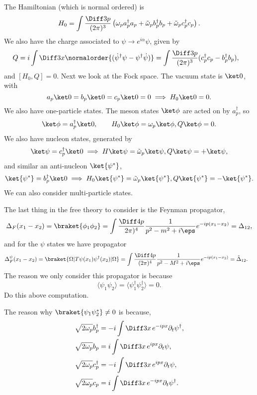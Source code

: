 \documentclass[12pt]{article}
\begin{document}
The Hamiltonian (which is normal ordered) is
\[
H_0 = \int \frac{\Diff3p}{(2\pi)^3} \left( \omega_p a_p^{\dagger} a_p + \tilde \omega_p b_p^{\dagger} b_p + \tilde \omega_p c_p^{\dagger} c_p \right).
\]
We also have the charge associated to $\psi \to e^{i\alpha} \psi$, given by
\begin{align*}
	Q &= i \int \Diff 3x \normalorder{( \dot \psi^{\dagger} \psi - \psi^{\dagger} \dot \psi)} = \int \frac{\Diff 3p}{(2 \pi)^3} (c_p^{\dagger} c_p - b_p^{\dagger} b_p),
\end{align*}
and $[H_0, Q] = 0$. Next we look at the Fock space. The vacuum state is $\ket 0$, with
\[
a_p \ket 0 = b_p \ket 0 = c_p \ket 0 = 0 \implies H_0 \ket 0 = 0.
\]
We also have one-particle states. The meson states $\ket \phi$ are acted on by $a_p^{\dagger}$, so
\[
\ket \phi = a_p^{\dagger} \ket 0, \qquad H_0 \ket \phi = \omega_p \ket \phi, Q \ket \phi = 0.
\]
We also have nucleon states, generated by
\[
\ket \psi = c_p^{\dagger} \ket 0 \implies H \ket \psi = \tilde \omega_p \ket \psi, Q \ket \psi = + \ket \psi,
\]
and similar an anti-nucleon $\ket{\psi^{\ast}}$,
\[
	\ket{\psi^{\ast}} = b_p^{\dagger} \ket 0 \implies H_0 \ket{\psi^{\ast}} = \tilde \omega_p \ket{\psi^{\ast}}, Q \ket{\psi^{\ast}} = - \ket{\psi^{\ast}}.
\]
We can also consider multi-particle states.

The last thing in the free theory to consider is the Feynman propagator,
\[
	\Delta_F(x_1 - x_2) = \braket{\phi_1 \phi_2} = \int \frac{\Diff 4 p}{2 \pi)^4} \frac{1}{p^2 - m^2 + i \eps} e^{-ip(x_1 - x_2)} = \Delta_{12},
\]
and for the $\psi$ states we have propagator
\begin{align*}
	\Delta^{\psi}_F(x_1 - x_2) &= \braket{\Omega | T \psi(x_1) \psi^{\dagger}(x_2) | \Omega} = \int \frac{\Diff 4 p}{(2 \pi)^{4}} \frac{1}{p^2 - M^2 + i \eps} e^{-ip(x_1 - x_2)} = \hat \Delta_{12}.
\end{align*}
The reason we only consider this propagator is because
\[
\langle \psi_1 \psi_2 \rangle = \langle \psi_1^{\dagger} \psi_2^{\dagger} \rangle = 0.
\]
Do this above computation.

The reason why $\braket{\psi_1 \psi_2^{\ast}} \neq 0$ is because,
\begin{align*}
	\sqrt{2 \omega_p} b_p^{\dagger} &= - i \int \Diff 3 x \, e^{-ipx} \partial_t \psi^{\dagger}, \\
	\sqrt{2 \omega_p} b_p &= i \int \Diff 3 x \, e^{ipx} \partial_t \psi, \\
	\sqrt{2 \omega_p} c_p^{\dagger} &= -i \int \Diff 3x \, e^{ipx} \partial_t \psi, \\
	\sqrt{2 \omega_p} c_p &= i \int \Diff 3 x \, e^{-ipx} \partial_t \psi^{\dagger}.
\end{align*}
\end{document}
